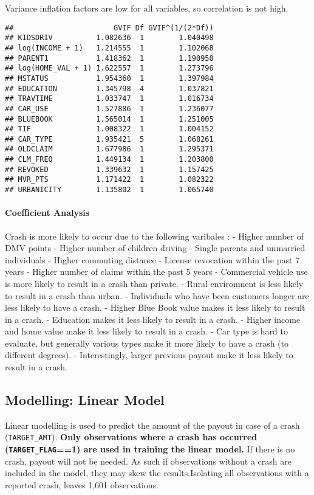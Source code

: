 \documentclass[]{article}
\let\oldparagraph\paragraph
\renewcommand{\paragraph}[1]{\oldparagraph{#1}\mbox{}}
\begin{document}
Variance inflation factors are low for all variables, so correlation is
not high.

\begin{verbatim}
##                       GVIF Df GVIF^(1/(2*Df))
## KIDSDRIV          1.082636  1        1.040498
## log(INCOME + 1)   1.214555  1        1.102068
## PARENT1           1.418362  1        1.190950
## log(HOME_VAL + 1) 1.622557  1        1.273796
## MSTATUS           1.954360  1        1.397984
## EDUCATION         1.345798  4        1.037821
## TRAVTIME          1.033747  1        1.016734
## CAR_USE           1.527886  1        1.236077
## BLUEBOOK          1.565014  1        1.251005
## TIF               1.008322  1        1.004152
## CAR_TYPE          1.935421  5        1.068261
## OLDCLAIM          1.677986  1        1.295371
## CLM_FREQ          1.449134  1        1.203800
## REVOKED           1.339632  1        1.157425
## MVR_PTS           1.171422  1        1.082322
## URBANICITY        1.135802  1        1.065740
\end{verbatim}

\paragraph{Coefficient Analysis}\label{coefficient-analysis}

Crash is more likely to occur due to the following varibales : - Higher
number of DMV points - Higher number of children driving - Single
parents and unmarried individuals - Higher commuting distance - License
revocation within the past 7 years - Higher number of claims within the
past 5 years - Commercial vehicle use is more likely to result in a
crash than private. - Rural environment is less likely to result in a
crash than urban. - Individuals who have been customers longer are less
likely to have a crash. - Higher Blue Book value makes it less likely to
result in a crash. - Education makes it less likely to result in a
crash. - Higher income and home value make it less likely to result in a
crash. - Car type is hard to evaluate, but generally various types make
it more likely to have a crash (to different degrees). - Interestingly,
larger previous payout make it less likely to result in a crash.

\subsection{Modelling: Linear Model}\label{modelling-linear-model}

Linear modelling is used to predict the amount of the payout in case of
a crash (\texttt{TARGET\_AMT}). \textbf{Only observations where a crash
has occurred (\texttt{TARGET\_FLAG}==1) are used in training the linear
model.} If there is no crash, payout will not be needed. As such if
observations without a crash are included in the model, they may skew
the results.Isolating all observations with a reported crash, leaves
1,601 observations.
\end{document}
